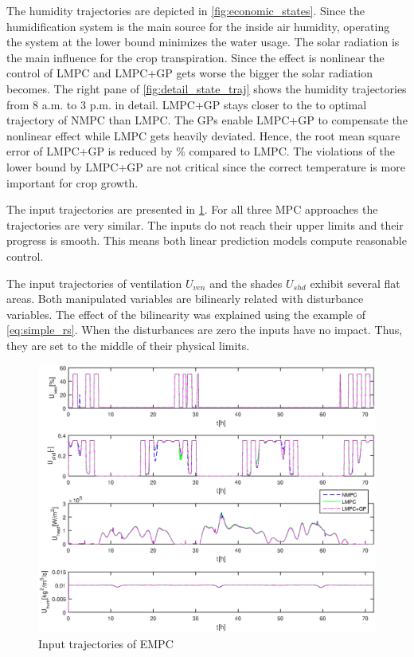 The humidity trajectories are depicted in \cref{fig:economic_states}.
Since the humidification system is the main source for the inside air humidity, operating the system at the lower bound minimizes the water usage.
The solar radiation is the main influence for the crop transpiration.
Since the effect is nonlinear the control of LMPC and LMPC+GP gets worse the bigger the solar radiation becomes.
The right pane of \cref{fig:detail_state_traj} shows the humidity trajectories from 8 a.m. to 3 p.m. in detail.
LMPC+GP stays closer to the to optimal trajectory of NMPC than LMPC.
The GPs enable LMPC+GP to compensate the nonlinear effect while LMPC gets heavily deviated.
Hence, the root mean square error of LMPC+GP is reduced by \unit[43]{\%} compared to LMPC.
The violations of the lower bound by LMPC+GP are not critical since the correct temperature is more important for crop growth.\par\medskip

The input trajectories are presented in \cref{fig:economic_control}.
For all three MPC approaches the trajectories are very similar.
The inputs do not reach their upper limits and their progress is smooth.
This means both linear prediction models compute reasonable control.

The input trajectories of ventilation $U_{ven}$ and the shades $U_{shd}$ exhibit several flat areas.
Both manipulated variables are bilinearly related with disturbance variables.
The effect of the bilinearity was explained using the example of \eqref{eq:simple_rs}.
When the disturbances are zero the inputs have no impact.
Thus, they are set to the middle of their physical limits.

\begin{figure}[t]
\begin{center}
	\includegraphics[width=\textwidth]{../Figures/economic_control.eps}
	\caption{Input trajectories of EMPC}
	\label{fig:economic_control}
\end{center}
\end{figure}

